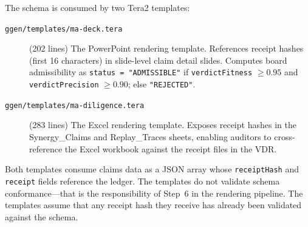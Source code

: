 The schema is consumed by two Tera2 templates:

\begin{description}
  \item[\texttt{ggen/templates/ma-deck.tera}] (202 lines) The PowerPoint rendering template.
    References receipt hashes (first 16 characters) in slide-level claim detail slides. Computes
    board admissibility as \texttt{status = "ADMISSIBLE"} if \texttt{verdictFitness} $\ge 0.95$
    and \texttt{verdictPrecision} $\ge 0.90$; else \texttt{"REJECTED"}.
  \item[\texttt{ggen/templates/ma-diligence.tera}] (283 lines) The Excel rendering template.
    Exposes receipt hashes in the Synergy\_Claims and Replay\_Traces sheets, enabling auditors to
    cross-reference the Excel workbook against the receipt files in the VDR.
\end{description}

Both templates consume claims data as a JSON array whose \texttt{receiptHash} and \texttt{receipt}
fields reference the ledger. The templates do not validate schema conformance---that is the
responsibility of Step~6 in the rendering pipeline. The templates assume that any receipt hash
they receive has already been validated against the schema.
